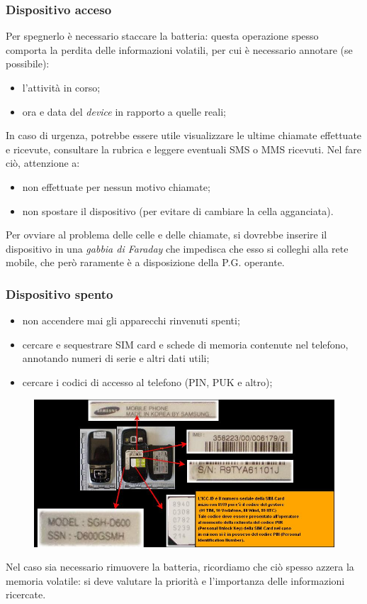 \documentclass[11pt]{beamer}
\begin{document}
	\begin{frame}[shrink]\label{frame:Dispositivo_mobile_acceso}
		\frametitle{Dispositivo acceso}
		Per spegnerlo è necessario staccare la batteria: questa operazione spesso comporta la perdita delle informazioni volatili, per cui è necessario annotare (se possibile):
		\begin{itemize}
			\item l'attività in corso;
			\item ora e data del \textit{device} in rapporto a quelle reali;
		\end{itemize} 
		
		In caso di urgenza, potrebbe essere utile visualizzare le ultime chiamate effettuate e ricevute, consultare la rubrica e leggere eventuali SMS o MMS ricevuti. Nel fare ciò, attenzione a:
		\begin{itemize}
			\item non effettuate per nessun motivo chiamate;
			\item non spostare il dispositivo (per evitare di cambiare la cella agganciata).
		\end{itemize}
		
		Per ovviare al problema delle celle e delle chiamate, si dovrebbe inserire il dispositivo in una \textit{gabbia di Faraday} che impedisca che esso si colleghi alla rete mobile, che però raramente è a disposizione della P.G. operante.
	\end{frame}
	
	\begin{frame}
		\frametitle{Dispositivo spento}
		\begin{itemize}
			\item non accendere mai gli apparecchi rinvenuti spenti;
			\item cercare e sequestrare SIM card e schede di memoria contenute nel telefono, annotando numeri di serie e altri dati utili;
			\item cercare i codici di accesso al telefono (PIN, PUK e altro);
		\end{itemize}
		
		\begin{figure}
			\centering
			\includegraphics[width=0.4\linewidth]{pics/samsung_example}
			\label{fig:samsung_example}
		\end{figure}
				
		Nel caso sia necessario rimuovere la batteria, ricordiamo che ciò spesso azzera la memoria volatile: si deve valutare la priorità e l'importanza delle informazioni ricercate.
	\end{frame}
	
\end{document}
